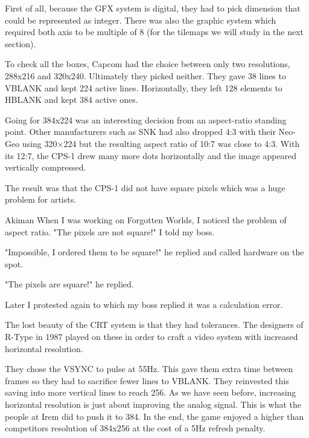 First of all, because the GFX system is digital, they had to pick dimension that could be represented as integer. There was also the graphic system which required both axis to be multiple of 8 (for the tilemaps we will study in the next section).

To check all the boxes, Capcom had the choice between only two resolutions, 288x216 and 320x240. Ultimately they picked neither. They gave 38 lines to VBLANK and kept 224 active lines\cite{petitCRT}. Horizontally, they left 128 elements to HBLANK and kept 384 active ones.  

Going for 384x224 was an interesting decision from an aspect-ratio standing point. Other manufacturers such as SNK had also dropped 4:3 with their Neo-Geo using 320×224 but the resulting aspect ratio of 10:7 was close to 4:3. With its 12:7, the CPS-1 drew many more dots horizontally and the image appeared vertically compressed. 

The result was that the CPS-1 did not have square pixels which was a huge problem for artists.  

\begin{q}{Akiman\cite{akiman}}
When I was working on Forgotten Worlds, I noticed the problem of aspect ratio. "The pixels are not square!" I told my boss.

"Impossible, I ordered them to be square!" he replied and called hardware on the spot.

"The pixels are square!" he replied. 

Later I protested again to which my boss replied it was a calculation error.
\end{q}


\begin{trivia}
The lost beauty of the CRT system is that they had tolerances. The designers of R-Type in 1987 played on these in order to craft a video system with increased horizontal resolution. 

They chose the VSYNC to pulse at 55Hz. This gave them extra time between frames so they had to sacrifice fewer lines to VBLANK. They reinvested this saving into more vertical lines to reach 256. As we have seen before, increasing horizontal resolution is just about improving the analog signal. This is what the people at Irem did to push it to 384. In the end, the game enjoyed a higher than competitors resolution of 384x256 at the cost of a 5Hz refresh penalty.
\end{trivia}



